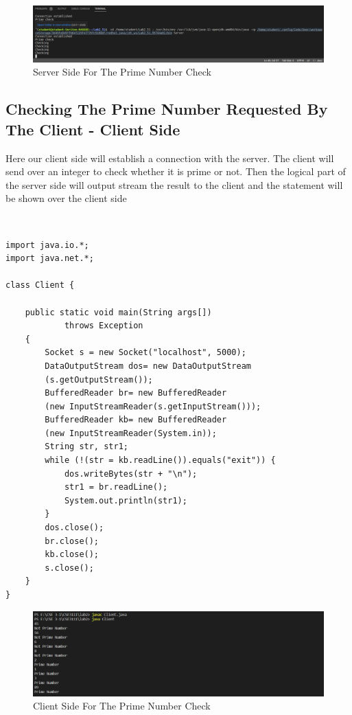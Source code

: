 \documentclass[11pt]{article}
\begin{document}
\begin{figure}[!h]
\centering
\includegraphics[width=\textwidth]{prime_server.png}
\caption{Server Side For The Prime Number Check}
\end{figure}
\newpage

\subsection{Checking The Prime Number Requested By The Client - Client Side}
Here our client side will establish a connection with the server. The client will send over an integer to check whether it is prime or not.  Then the logical part of the server side will output stream the result to the client and the statement will be shown over the client side

\
\begin{verbatim}
import java.io.*;
import java.net.*;

class Client {

    public static void main(String args[])
            throws Exception
    {
        Socket s = new Socket("localhost", 5000);
        DataOutputStream dos= new DataOutputStream
        (s.getOutputStream());
        BufferedReader br= new BufferedReader
        (new InputStreamReader(s.getInputStream()));
        BufferedReader kb= new BufferedReader
        (new InputStreamReader(System.in));
        String str, str1;
        while (!(str = kb.readLine()).equals("exit")) {
            dos.writeBytes(str + "\n");
            str1 = br.readLine();
            System.out.println(str1);
        }
        dos.close();
        br.close();
        kb.close();
        s.close();
    }
}
\end{verbatim}

\begin{figure}[!h]
\centering
\includegraphics[width=\textwidth]{prime_client.png}
\caption{Client Side For The Prime Number Check}
\end{figure}
\newpage
\end{document}
